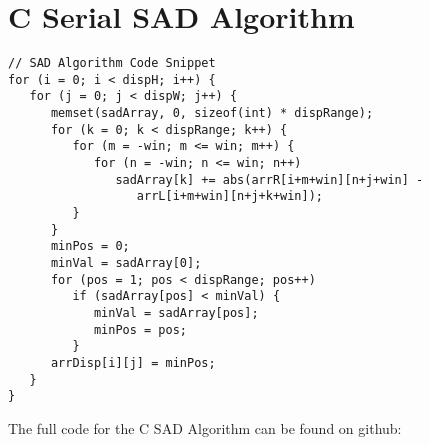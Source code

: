 \chapter{C Serial SAD Algorithm}
\label{sec:appdxE}



\begin{lstlisting}
// SAD Algorithm Code Snippet
for (i = 0; i < dispH; i++) {
   for (j = 0; j < dispW; j++) {
      memset(sadArray, 0, sizeof(int) * dispRange);
      for (k = 0; k < dispRange; k++) {
         for (m = -win; m <= win; m++) {
            for (n = -win; n <= win; n++)
               sadArray[k] += abs(arrR[i+m+win][n+j+win] - 
                  arrL[i+m+win][n+j+k+win]);
         }
      }
      minPos = 0;
      minVal = sadArray[0];
      for (pos = 1; pos < dispRange; pos++)
         if (sadArray[pos] < minVal) {
            minVal = sadArray[pos];
            minPos = pos;
         }
      arrDisp[i][j] = minPos;
   }
}
\end{lstlisting}

The full code for the C SAD Algorithm can be found on github:
\\


%
%
